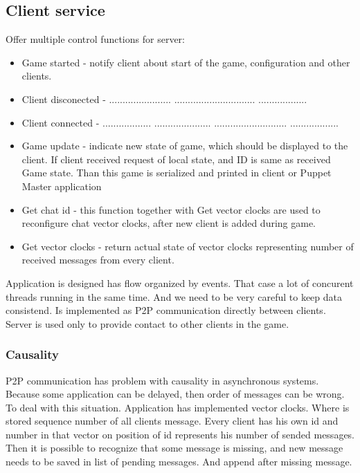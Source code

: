 \documentclass[times, 10pt,twocolumn]{article}
\begin{document}
\subsection{Client service}
Offer multiple control functions for server:
\begin{itemize}
	\item Game started - notify client about start of the game, configuration and other clients.
	\item Client disconected - ....................... .............................. ..................
	\item Client connected - ..................   ..................... ........................... ..................
	\item Game update - indicate new state of game, which should be displayed to the client. If client received request of local state, and ID is same as received Game state. Than this game is serialized and printed in client or Puppet Master application
	\item Get chat id - this function together with Get vector clocks are used to reconfigure chat vector clocks, after new client is added during game.
	\item Get vector clocks - return actual state of vector clocks representing number of received messages from every client.
\end{itemize}
Application is designed has flow organized by events. That case a lot of concurent threads running in the same time. And we need to be very careful to keep data consistend.
Is implemented as P2P communication directly between clients. Server is used only to provide contact to other clients in the game.
\subsubsection{Causality}
P2P communication has problem with causality in asynchronous systems. Because some application can be delayed, then order of messages can be wrong. To deal with this situation. Application has implemented vector clocks. Where is stored sequence number of all clients message. Every client has his own id and number in that vector on position of id represents his number of sended messages. Then it is possible to recognize that some message is missing, and new message needs to be saved in list of pending messages. And append after missing message.
\end{document}
